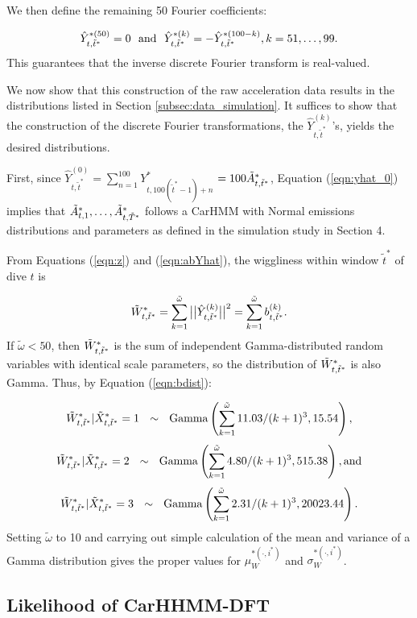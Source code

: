    We then define the remaining 50 Fourier coefficients:
   
    \[
        \hat{Y}^{*(50)}_{t,\tilde t^*} = 0 {\rm{~~and ~~}}
	    \hat{Y}^{*(k)}_{t,\tilde t^*} = -\hat{Y}^{*(100-k)}_{t,\tilde t^*} , k = 51,\ldots,99.
    \]
   This guarantees that the inverse discrete Fourier transform is real-valued. 
  

We now show that this construction of the raw acceleration data results in the distributions listed in Section \ref{subsec:data_simulation}. It suffices to show that the construction of the discrete Fourier transformations, the $\hat{Y}^{(k)}_{t,\tilde t^*}$'s, yields the desired distributions.

First, since $\hat{Y}^{(0)}_{t,\tilde t^*} = \sum_{n=1}^{100} Y^*_{t,100(\tilde t^* - 1) + n} $ $=100\tilde{A}^*_{t,\tilde{t}^*}$, Equation (\ref{eqn:yhat_0}) implies that 
$\tilde{A}^*_{t,1}, \ldots, \tilde{A}^*_{t,\tilde{T}^*}$ 
follows a CarHMM with Normal emissions distributions and parameters as defined in the simulation study in Section 4.

From Equations (\ref{eqn:z}) and (\ref{eqn:abYhat}), 
the wiggliness within window $\tilde t^*$ of dive $t$ is 

\[
    \tilde{W}^*_{t,\tilde t^*} = \sum_{k=1}^{\tilde \omega} \big|\big|\hat{Y}^{(k)}_{t,\tilde t^*}\big|\big|^2 =  \sum_{k=1}^{\tilde \omega} b^{(k)}_{t,\tilde t^*}.
\]
%
If $\tilde \omega < 50$, then $\tilde{W}^*_{t,\tilde t^*}$ is the sum of independent Gamma-distributed random variables with identical scale parameters, so the distribution of $\tilde{W}^*_{t,\tilde t^*}$ is also Gamma. Thus, by Equation (\ref{eqn:bdist}):

\[
    \tilde{W}^*_{t,\tilde t^*}|\tilde X^*_{t,\tilde t^*} = 1  ~~ \sim ~~ {\rm{Gamma}}\left(\sum_{k=1}^{\tilde \omega} 11.03/(k+1)^3 , 15.54 \right),
\]
%
\[
    \tilde{W}^*_{t,\tilde t^*}|\tilde X^*_{t,\tilde t^*} = 2 ~~\sim~~ {\rm{Gamma}}\left(\sum_{k=1}^{\tilde \omega} 4.80/(k+1)^3 , 515.38 \right), \text{and}
\]
%
\[
    \tilde{W}^*_{t,\tilde t^*}|\tilde X^*_{t,\tilde t^*} = 3  ~~ \sim ~~ {\rm{Gamma}}\left(\sum_{k=1}^{\tilde \omega} 2.31/(k+1)^3 , 20023.44 \right).
\]
Setting $\tilde \omega$ to 10 and carrying out simple calculation of the mean and variance of a Gamma distribution gives the proper values for $\mu_W^{*(\cdot,i^*)}$ and $\sigma_W^{*(\cdot,i^*)}$.


\subsection{Likelihood of CarHHMM-DFT}

